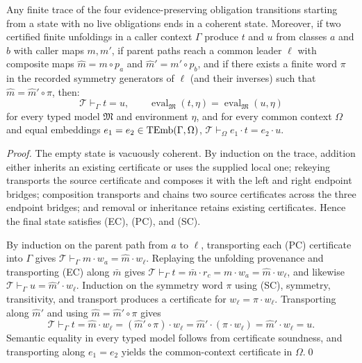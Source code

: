 \begin{theorem}
\label{thm:semantic-sound}
Any finite trace of the four evidence-preserving obligation transitions
starting from a state with no live obligations ends in a coherent state.
Moreover, if two certified finite unfoldings in a caller context $\Gamma$
produce $t$ and $u$ from classes $a$ and $b$ with caller maps $m,m'$, if parent
paths reach a common leader $\ell$ with composite maps $\widehat m=m\circ p_a$
and $\widehat m'=m'\circ p_b$, and if there exists a finite word $\pi$ in the
recorded symmetry generators of $\ell$ (and their inverses) such that
$\widehat m=\widehat m'\circ\pi$, then:
\[
 \mathcal T\vdash_\Gamma t=u,
 \qquad
 \operatorname{eval}_{\mathfrak M}(t,\eta)
 =\operatorname{eval}_{\mathfrak M}(u,\eta)
\]
for every typed model $\mathfrak M$ and environment $\eta$, and for every
common context $\Omega$ and equal embeddings $e_1=e_2\in\operatorname{TEmb}(\Gamma,\Omega)$,
$\mathcal T\vdash_\Omega e_1\cdot t=e_2\cdot u$.
\end{theorem}
\begin{proof}
The empty state is vacuously coherent. By induction on the trace, addition
either inherits an existing certificate or uses the supplied local one;
rekeying transports the source certificate and composes it with the left and
right endpoint bridges; composition transports and chains two source
certificates across the three endpoint bridges; and removal or inheritance
retains existing certificates. Hence the final state satisfies (EC), (PC), and
(SC).

By induction on the parent path from $a$ to $\ell$, transporting each (PC)
certificate into $\Gamma$ gives $\mathcal T\vdash_\Gamma m\cdot w_a=\widehat m\cdot w_\ell$.
Replaying the unfolding provenance and transporting (EC) along $\bar m$ gives
$\mathcal T\vdash_\Gamma t=\bar m\cdot r_c=m\cdot w_a=\widehat m\cdot w_\ell$,
and likewise $\mathcal T\vdash_\Gamma u=\widehat m'\cdot w_\ell$. Induction on
the symmetry word $\pi$ using (SC), symmetry, transitivity, and transport
produces a certificate for $w_\ell=\pi\cdot w_\ell$. Transporting along
$\widehat m'$ and using $\widehat m=\widehat m'\circ\pi$ gives
\[
 \mathcal T\vdash_\Gamma t
 =\widehat m\cdot w_\ell
 =(\widehat m'\circ\pi)\cdot w_\ell
 =\widehat m'\cdot(\pi\cdot w_\ell)
 =\widehat m'\cdot w_\ell
 =u.
\]
Semantic equality in every typed model follows from certificate soundness, and
transporting along $e_1=e_2$ yields the common-context certificate in $\Omega$.\qed
\end{proof}

